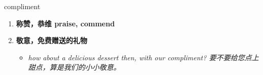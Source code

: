 
\begin{frame}
{\huge compliment}
\begin{center}
\begin{enumerate}\Large
  \item \textbf{称赞，恭维 praise, commend}
  \item \textbf{敬意，免费赠送的礼物}
  \begin{itemize}
    \item \em{\Large{how about a delicious dessert then, with our compliment? 要不要给您点上甜点，算是我们的小小敬意。}}
  \end{itemize}
\end{enumerate}
\end{center}
\end{frame}
